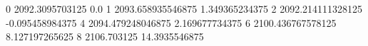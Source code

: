 0 2092.3095703125 0.0
1 2093.658935546875 1.349365234375
2 2092.214111328125 -0.095458984375
4 2094.479248046875 2.169677734375
6 2100.436767578125 8.127197265625
8 2106.703125 14.3935546875
